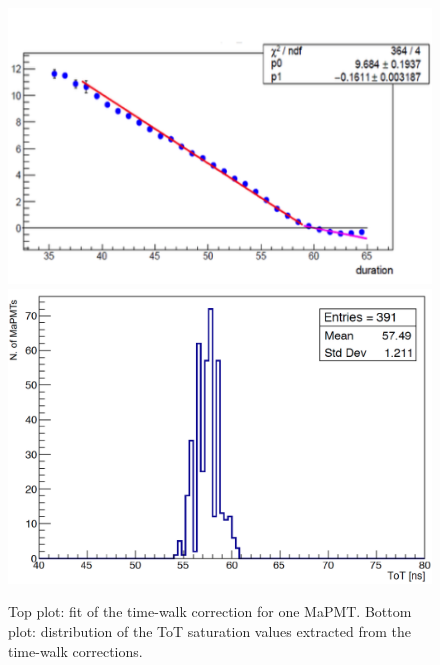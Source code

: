 \documentclass[5p,times,twocolumn]{elsarticle}
\begin{document}
\begin{figure}[t]
\begin{center}
\includegraphics[width=1.0\columnwidth]{time_walk_fit.png}
\includegraphics[width=0.9\columnwidth]{Saturation_ToT2.png}
\end{center}
\caption{Top plot: fit of the time-walk correction for one MaPMT. Bottom plot: distribution of the ToT saturation
  values extracted from the time-walk corrections.}
\label{Fig:TimeWalk}
\end{figure}
\end{document}
